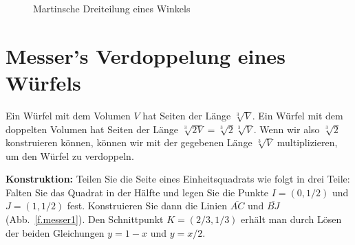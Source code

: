 \begin{figure}[t]
\begin{center}
\end{center}
\caption{Martinsche Dreiteilung eines Winkels}\label{f.martin}
\end{figure}


\section{Messer's Verdoppelung eines Würfels}\label{s.messer}

Ein Würfel mit dem Volumen $V$ hat Seiten der Länge $\sqrt[3]{V}$. Ein Würfel mit dem doppelten Volumen hat Seiten der Länge $\sqrt[3]{2 V}=\sqrt[3]{2}\sqrt[3]{V}$. Wenn wir also $\sqrt[3]{2}$ konstruieren können, können wir mit der gegebenen Länge $\sqrt[3]{V}$ multiplizieren, um den Würfel zu verdoppeln.

\medspace

\noindent{}\textbf{Konstruktion:}
Teilen Sie die Seite eines Einheitsquadrats wie folgt in drei Teile: Falten Sie das Quadrat in der Hälfte und legen Sie die Punkte $I=(0,1/2)$ und $J=(1,1/2)$ fest. Konstruieren Sie dann die Linien $\overline{AC}$ und $\overline{BJ}$ (Abb.~\ref{f.messer1}). Den Schnittpunkt $K=(2/3,1/3)$ erhält man durch Lösen der beiden Gleichungen $y=1-x$ und $y=x/2$.

